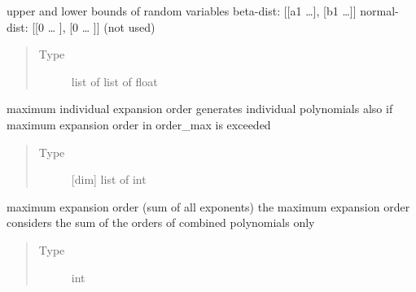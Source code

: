 \documentclass[letterpaper,10pt,english,openany,oneside]{sphinxmanual}
\begin{document}
\begin{fulllineitems}
\begin{fulllineitems}
\begin{quote}
\begin{description}
\end{description}\end{quote}

\end{fulllineitems}


\begin{fulllineitems}
\label{\detokenize{pygpc:pygpc.gpc.gPC.limits}}
upper and lower bounds of random variables
beta-dist:   {[}{[}a1 …{]}, {[}b1 …{]}{]}
normal-dist: {[}{[}0 … {]}, {[}0 … {]}{]} (not used)
\begin{quote}\begin{description}
\item[{Type}] \leavevmode
list of list of float

\end{description}\end{quote}

\end{fulllineitems}


\begin{fulllineitems}
\label{\detokenize{pygpc:pygpc.gpc.gPC.order}}
maximum individual expansion order
generates individual polynomials also if maximum expansion order in order\_max is exceeded
\begin{quote}\begin{description}
\item[{Type}] \leavevmode
{[}dim{]} list of int

\end{description}\end{quote}

\end{fulllineitems}


\begin{fulllineitems}
\label{\detokenize{pygpc:pygpc.gpc.gPC.order_max}}
maximum expansion order (sum of all exponents)
the maximum expansion order considers the sum of the orders of combined polynomials only
\begin{quote}\begin{description}
\item[{Type}] \leavevmode
int


\end{description}
\end{quote}
\end{fulllineitems}
\end{fulllineitems}
\end{document}
